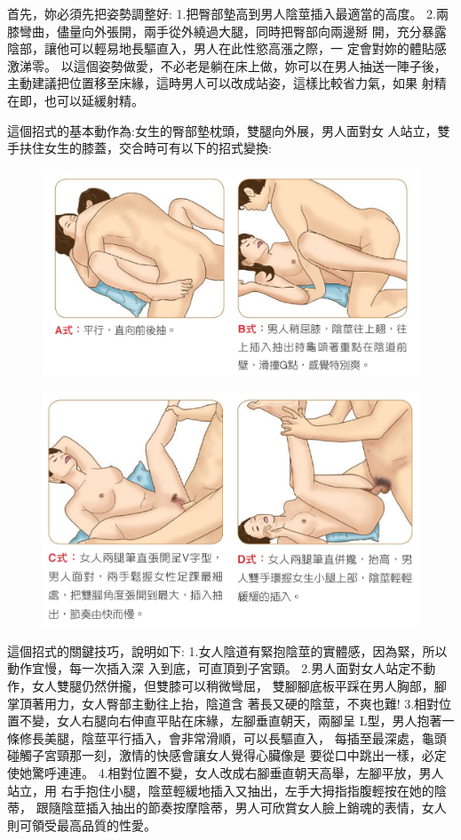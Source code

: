 \documentclass[12pt,UTF8]{ctexbook}
\begin{document}
首先，妳必須先把姿勢調整好:
1.把臀部墊高到男人陰莖插入最適當的高度。
2.兩膝彎曲，儘量向外張開，兩手從外繞過大腿，同時把臀部向兩邊掰
開，充分暴露陰部，讓他可以輕易地長驅直入，男人在此性慾高漲之際，一
定會對妳的體貼感激涕零。
以這個姿勢做愛，不必老是躺在床上做，妳可以在男人抽送一陣子後，
主動建議把位置移至床緣，這時男人可以改成站姿，這樣比較省力氣，如果
射精在即，也可以延緩射精。

這個招式的基本動作為:女生的臀部墊枕頭，雙腿向外展，男人面對女
人站立，雙手扶住女生的膝蓋，交合時可有以下的招式變換:

\begin{figure}[htbp]
	\centering
	\includegraphics[width=0.7\linewidth]{29}
	\caption{}
	\label{fig:1}
\end{figure}

\begin{figure}[htbp]
	\centering
	\includegraphics[width=0.7\linewidth]{30}
	\caption{}
	\label{fig:1}
\end{figure}

這個招式的關鍵技巧，說明如下:
1.女人陰道有緊抱陰莖的實體感，因為緊，所以動作宜慢，每一次插入深
入到底，可直頂到子宮頸。
2.男人面對女人站定不動作，女人雙腿仍然併攏，但雙膝可以稍微彎屈，
雙腳腳底板平踩在男人胸部，腳掌頂著用力，女人臀部主動往上抬，陰道含
著長又硬的陰莖，不爽也難!
3.相對位置不變，女人右腿向右伸直平貼在床緣，左腳垂直朝天，兩腳呈
L型，男人抱著一條修長美腿，陰莖平行插入，會非常滑順，可以長驅直入，
每插至最深處，龜頭碰觸子宮頸那一刻，激情的快感會讓女人覺得心臟像是
要從口中跳出一樣，必定使她驚呼連連。
4.相對位置不變，女人改成右腳垂直朝天高舉，左腳平放，男人站立，用
右手抱住小腿，陰莖輕緩地插入又抽出，左手大拇指指腹輕按在她的陰蒂，
跟隨陰莖插入抽出的節奏按摩陰蒂，男人可欣賞女人臉上銷魂的表情，女人
則可領受最高品質的性愛。
\end{document}
